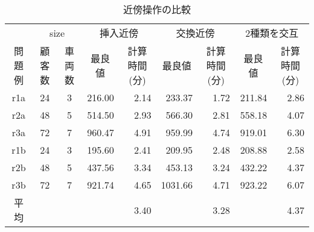 \begin{table}[]
  \renewcommand{\arraystretch}{0.8}
  \caption{近傍操作の比較}
  \label{insert}
\begin{tabular}{cccrrrrrr}
\hline
\multicolumn{1}{l}{} & \multicolumn{2}{c}{size} & \multicolumn{2}{c}{挿入近傍}                              & \multicolumn{2}{c}{交換近傍}                              & \multicolumn{2}{c}{2種類を交互}                            \\ \cline{2-9}
問題例                  & 顧客数         & 車両数        & \multicolumn{1}{c}{最良値} & \multicolumn{1}{c}{計算時間(分)} & \multicolumn{1}{c}{最良値} & \multicolumn{1}{c}{計算時間(分)} & \multicolumn{1}{c}{最良値} & \multicolumn{1}{c}{計算時間(分)} \\ \cline{2-9}
r1a                  & 24          & 3          & 216.00                  & 2.14                        & 233.37                  & 1.72                        & 211.84                  & 2.86                        \\
r2a                  & 48          & 5          & 514.50                  & 2.93                        & 566.30                  & 2.81                        & 558.18                  & 4.07                        \\
r3a                  & 72          & 7          & 960.47                  & 4.91                        & 959.99                  & 4.74                        & 919.01                  & 6.30                        \\
r1b                  & 24          & 3          & 195.60                  & 2.41                        & 209.95                  & 2.48                        & 208.88                  & 2.58                        \\
r2b                  & 48          & 5          & 437.56                  & 3.34                        & 453.13                  & 3.24                        & 432.22                & 4.37                        \\
r3b                  & 72          & 7          & 921.74                  & 4.65                        & 1031.66                 & 4.71                        & 923.22                & 6.07                        \\ \hline
平均                   & \multicolumn{1}{l}{} & \multicolumn{1}{l}{} & \multicolumn{1}{l}{}    & 3.40                        &                         & 3.28                        &                         & 4.37                        \\ \hline
\end{tabular}
\end{table}




